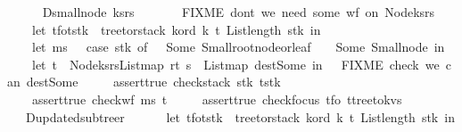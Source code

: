 \begin{isabellebody}
\ \ {\isacharparenright}\isanewline
\ \ {\isacharbar}\ D{\isacharunderscore}small{\isacharunderscore}node\ {\isacharparenleft}ks{\isacharcomma}rs{\isacharparenright}\ {\isasymRightarrow}\ {\isacharparenleft}\isanewline
\ \ \ \ {\isacharparenleft}{\isacharasterisk}\ FIXME\ don{\isacharprime}t\ we\ need\ some\ wf\ on\ Node{\isacharparenleft}ks{\isacharcomma}rs{\isacharparenright}{\isacharquery}\ {\isacharasterisk}{\isacharparenright}\isanewline
\ \ \ \ let\ {\isacharparenleft}t{\isacharunderscore}fo{\isacharcomma}t{\isacharunderscore}stk{\isacharparenright}\ {\isacharequal}\ tree{\isacharunderscore}to{\isacharunderscore}rstack\ k{\isacharunderscore}ord\ k\ t{}\ {\isacharparenleft}List{\isachardot}length\ stk{\isacharparenright}\ in\isanewline
\ \ \ \ let\ ms\ \ {\isacharequal}\ {\isacharparenleft}case\ stk\ of\ {\isacharbrackleft}{\isacharbrackright}\ {\isasymRightarrow}\ Some\ Small{\isacharunderscore}root{\isacharunderscore}node{\isacharunderscore}or{\isacharunderscore}leaf\ {\isacharbar}\ {\isacharunderscore}\ {\isasymRightarrow}\ Some\ Small{\isacharunderscore}node{\isacharparenright}\ in\isanewline
\ \ \ \ let\ t\ {\isacharequal}\ Node{\isacharparenleft}ks{\isacharcomma}rs{\isacharbar}{\isachargreater}List{\isachardot}map\ {\isacharparenleft}r{}t\ s{\isacharparenright}\ {\isacharbar}{\isachargreater}\ List{\isachardot}map\ dest{\isacharunderscore}Some{\isacharparenright}\ in\ \ {\isacharparenleft}{\isacharasterisk}\ FIXME\ check\ we\ can\ dest{\isacharunderscore}Some\ {\isacharasterisk}{\isacharparenright}\isanewline
\ \ \ \ assert{\isacharunderscore}true\ {\isacharparenleft}check{\isacharunderscore}stack\ stk\ t{\isacharunderscore}stk{\isacharparenright}\ {\isacharampersand}\isanewline
\ \ \ \ assert{\isacharunderscore}true\ {\isacharparenleft}check{\isacharunderscore}wf\ ms\ t{\isacharparenright}\ {\isacharampersand}\isanewline
\ \ \ \ assert{\isacharunderscore}true\ {\isacharparenleft}check{\isacharunderscore}focus\ t{\isacharunderscore}fo\ {\isacharparenleft}t{\isacharbar}{\isachargreater}tree{\isacharunderscore}to{\isacharunderscore}kvs{\isacharparenright}{\isacharparenright}\ \ \ \isanewline
\ \ {\isacharparenright}\isanewline
\ \ {\isacharbar}\ D{\isacharunderscore}updated{\isacharunderscore}subtree{\isacharparenleft}r{\isacharparenright}\ {\isasymRightarrow}\ {\isacharparenleft}\isanewline
\ \ \ \ let\ {\isacharparenleft}t{\isacharunderscore}fo{\isacharcomma}t{\isacharunderscore}stk{\isacharparenright}\ {\isacharequal}\ tree{\isacharunderscore}to{\isacharunderscore}rstack\ k{\isacharunderscore}ord\ k\ t{}\ {\isacharparenleft}List{\isachardot}length\ stk{\isacharparenright}\ in\isanewline

\end{isabellebody}
